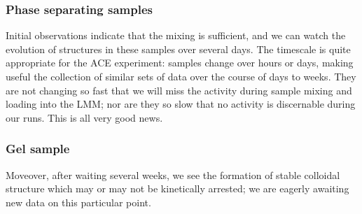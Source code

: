 \subsubsection{Phase separating
samples}\hypertarget{phase-separating-samples}{}\label{phase-separating-samples} Initial observations indicate that the mixing is sufficient, and we can watch
the evolution of structures in these samples over several days. The timescale is
quite appropriate for the ACE experiment: samples change over hours or days,
making useful the collection of similar sets of data over the course of days to
weeks. They are not changing so fast that we will miss the activity during
sample mixing and loading into the LMM; nor are they so slow that no activity is
discernable during our runs. This is all very good news.

\subsubsection{Gel sample}\hypertarget{gel-sample}{}\label{gel-sample}
Moveover, after waiting several weeks, we see the formation of stable colloidal
structure which may or may not be kinetically arrested; we are eagerly awaiting
new data on this particular point.

